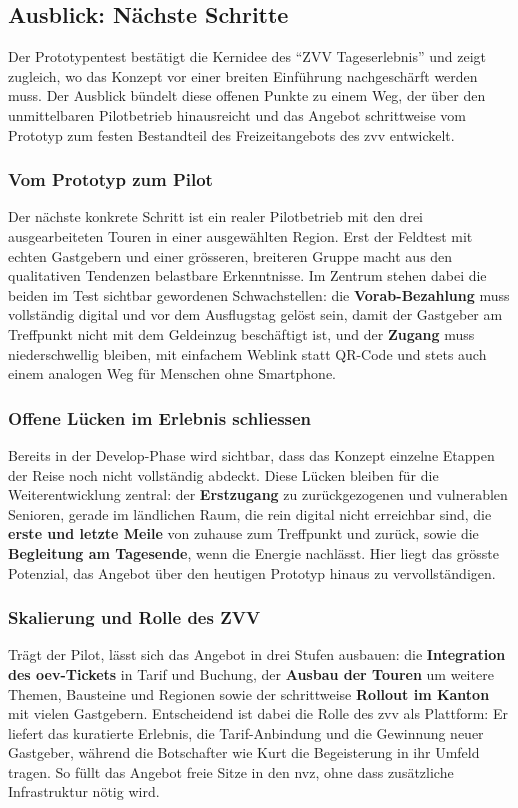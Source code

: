 \subsection{Ausblick: Nächste Schritte}

Der Prototypentest bestätigt die Kernidee des \enquote{ZVV Tageserlebnis} und zeigt zugleich, wo das Konzept vor einer breiten Einführung nachgeschärft werden muss. Der Ausblick bündelt diese offenen Punkte zu einem Weg, der über den unmittelbaren Pilotbetrieb hinausreicht und das Angebot schrittweise vom Prototyp zum festen Bestandteil des Freizeitangebots des \gls{zvv} entwickelt.

\subsubsection{Vom Prototyp zum Pilot}
Der nächste konkrete Schritt ist ein realer Pilotbetrieb mit den drei ausgearbeiteten Touren in einer ausgewählten Region. Erst der Feldtest mit echten Gastgebern und einer grösseren, breiteren Gruppe macht aus den qualitativen Tendenzen belastbare Erkenntnisse. Im Zentrum stehen dabei die beiden im Test sichtbar gewordenen Schwachstellen: die \textbf{Vorab-Bezahlung} muss vollständig digital und vor dem Ausflugstag gelöst sein, damit der Gastgeber am Treffpunkt nicht mit dem Geldeinzug beschäftigt ist, und der \textbf{Zugang} muss niederschwellig bleiben, mit einfachem Weblink statt QR-Code und stets auch einem analogen Weg für Menschen ohne Smartphone.

\subsubsection{Offene Lücken im Erlebnis schliessen}
Bereits in der Develop-Phase wird sichtbar, dass das Konzept einzelne Etappen der Reise noch nicht vollständig abdeckt. Diese Lücken bleiben für die Weiterentwicklung zentral: der \textbf{Erstzugang} zu zurückgezogenen und vulnerablen Senioren, gerade im ländlichen Raum, die rein digital nicht erreichbar sind, die \textbf{erste und letzte Meile} von zuhause zum Treffpunkt und zurück, sowie die \textbf{Begleitung am Tagesende}, wenn die Energie nachlässt. Hier liegt das grösste Potenzial, das Angebot über den heutigen Prototyp hinaus zu vervollständigen.

\subsubsection{Skalierung und Rolle des ZVV}
Trägt der Pilot, lässt sich das Angebot in drei Stufen ausbauen: die \textbf{Integration des \gls{oev}-Tickets} in Tarif und Buchung, der \textbf{Ausbau der Touren} um weitere Themen, Bausteine und Regionen sowie der schrittweise \textbf{Rollout im Kanton} mit vielen Gastgebern. Entscheidend ist dabei die Rolle des \gls{zvv} als Plattform: Er liefert das kuratierte Erlebnis, die Tarif-Anbindung und die Gewinnung neuer Gastgeber, während die Botschafter wie Kurt die Begeisterung in ihr Umfeld tragen. So füllt das Angebot freie Sitze in den \gls{nvz}, ohne dass zusätzliche Infrastruktur nötig wird.


